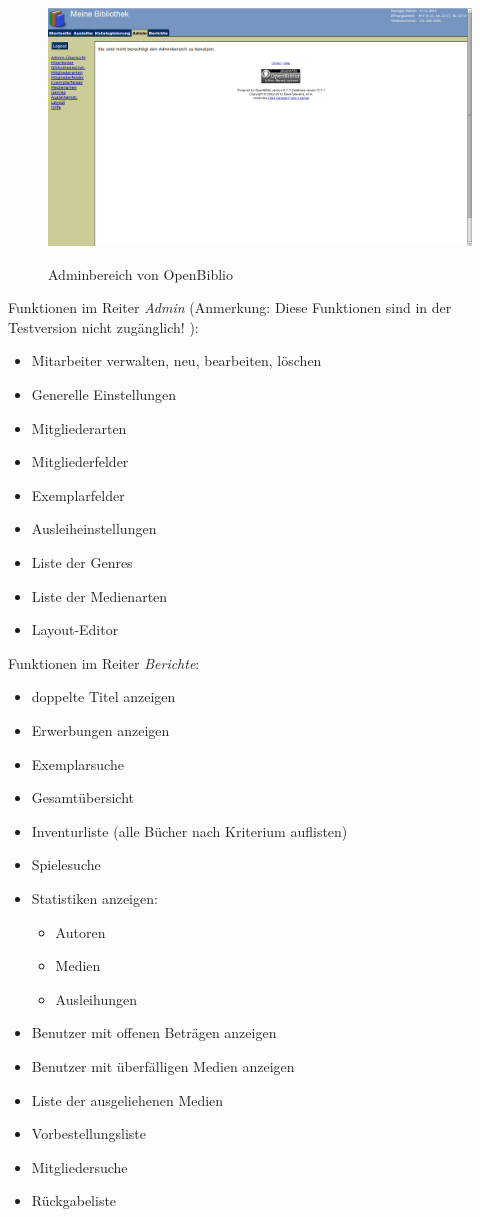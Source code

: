 \documentclass[fontsize=12pt,paper=a4,twoside]{scrartcl}
\begin{document}
\newpage 
\begin{figure}
	[H] \caption{Adminbereich von OpenBiblio} 
	\includegraphics[width=1 
	\textwidth]{OpenBiblio/reiter_admin.png} \label{admin-openbiblio} 
\end{figure}
Funktionen im Reiter \emph{Admin} (Anmerkung: Diese Funktionen sind in der Testversion nicht zugänglich! ):\\
\begin{itemize}
	\item Mitarbeiter verwalten, neu, bearbeiten, löschen 
	\item Generelle Einstellungen 
	\item Mitgliederarten 
	\item Mitgliederfelder 
	\item Exemplarfelder 
	\item Ausleiheinstellungen 
	\item Liste der Genres 
	\item Liste der Medienarten 
	\item Layout-Editor 
\end{itemize}
\newpage Funktionen im Reiter \emph{Berichte}:\\
\begin{itemize}
	\item doppelte Titel anzeigen 
	\item Erwerbungen anzeigen 
	\item Exemplarsuche 
	\item Gesamtübersicht 
	\item Inventurliste (alle Bücher nach Kriterium auflisten) 
	\item Spielesuche 
	\item Statistiken anzeigen: 
	\begin{itemize}
		\item Autoren 
		\item Medien 
		\item Ausleihungen 
	\end{itemize}
	\item Benutzer mit offenen Beträgen anzeigen 
	\item Benutzer mit überfälligen Medien anzeigen 
	\item Liste der ausgeliehenen Medien 
	\item Vorbestellungsliste 
	\item Mitgliedersuche 
	\item Rückgabeliste 
\end{itemize}
\end{document}
